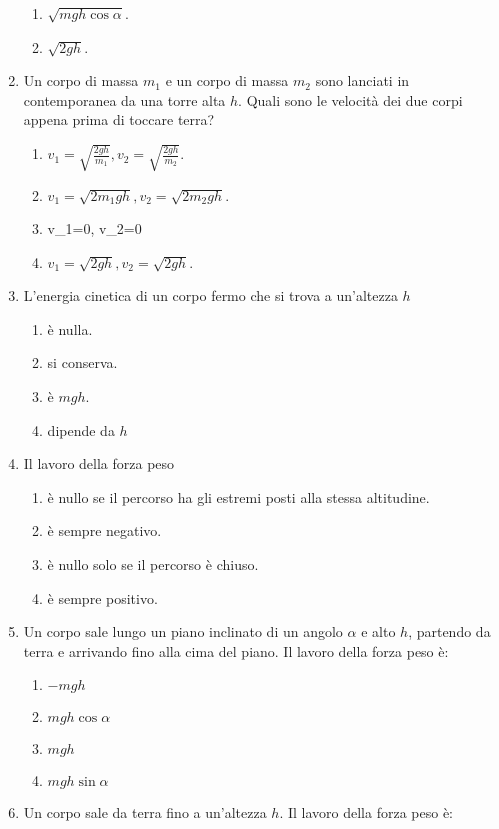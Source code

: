 \documentclass{article}
\begin{document}
\begin{enumerate}
\begin{enumerate}[label=\Alph*.]
    \item $\sqrt{mgh\cos\alpha}$.
    \item $\sqrt{2gh}$.
  \end{enumerate}
  \item Un corpo di massa $m_1$ e un corpo di massa $m_2$ sono lanciati in contemporanea da una torre alta $h$. Quali sono le velocità dei due corpi appena prima di toccare terra?
  \begin{enumerate}[label=\Alph*.]
    \item $v_1=\sqrt{\frac{2gh}{m_1}}, v_2=\sqrt{\frac{2gh}{m_2}}$.
    \item $v_1=\sqrt{2m_1gh}, v_2=\sqrt{2m_2gh}$.
    \item v_1=0, v_2=0
    \item $v_1=\sqrt{2gh}, v_2=\sqrt{2gh}$.
  \end{enumerate}
  \item L'energia cinetica di un corpo fermo che si trova a un'altezza $h$
  \begin{enumerate}[label=\Alph*.]
    \item è nulla.
    \item si conserva.
    \item è $mgh$.
    \item dipende da $h$
  \end{enumerate}
  \item Il lavoro della forza peso
  \begin{enumerate}[label=\Alph*.]
    \item è nullo se il percorso ha gli estremi posti alla stessa altitudine.
    \item è sempre negativo.
    \item è nullo solo se il percorso è chiuso.
    \item è sempre positivo.
  \end{enumerate}
  \item Un corpo sale lungo un piano inclinato di un angolo $\alpha$ e alto $h$, partendo da terra e arrivando fino alla cima del piano. Il lavoro della forza peso è:
  \begin{enumerate}[label=\Alph*.]
    \item $-mgh$
    \item $mgh\cos\alpha$
    \item $mgh$
    \item $mgh\sin\alpha$
  \end{enumerate}
  \item Un corpo sale da terra fino a un'altezza $h$. Il lavoro della forza peso è:

\end{enumerate}
\end{document}
